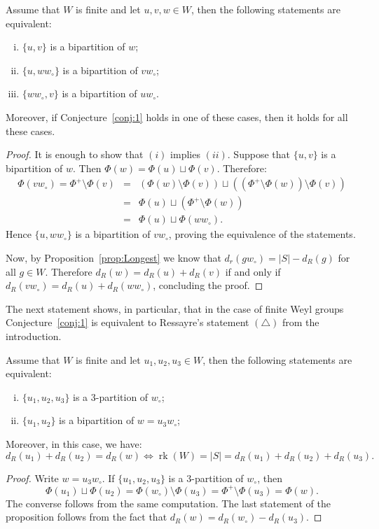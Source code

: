 \documentclass[ALCO,Unicode]{cedram}
\theoremstyle{definition}
\newcommand{\rank}{\operatorname{rk}}
\begin{document}
\begin{prop}\label{prop:ReductionLongest} Assume that $W$ is finite and let $u,v,w\in W$, then the following statements are equivalent:
\begin{enumerate}[(i)]
\item $\{u,v\}$ is a bipartition of $w$;
\item  $\{u,ww_\circ\}$ is a bipartition of $vw_\circ$;
\item $\{ww_\circ,v\}$ is a bipartition of $uw_\circ$.
\end{enumerate}
Moreover, if Conjecture~\ref{conj:1} holds in one of these cases, then it holds for all these cases. 
\end{prop}
\begin{proof} It is enough to show that $(i)$ implies $(ii)$. Suppose that $\{u,v\}$ is a bipartition of $w$. Then $\Phi(w)=\Phi(u)\sqcup \Phi(v)$. Therefore:
\begin{eqnarray*}
\Phi(vw_\circ)=\Phi^+\setminus\Phi(v)&=&(\Phi(w)\setminus \Phi(v)) \sqcup  ((\Phi^+\setminus\Phi(w))\setminus \Phi(v))\\
&=& \Phi(u) \sqcup  (\Phi^+\setminus\Phi(w))\\
&=& \Phi(u) \sqcup  \Phi(ww_\circ).
\end{eqnarray*}
Hence $\{u,ww_\circ\}$ is a bipartition of $vw_\circ$, proving the equivalence of the statements. 

Now, by Proposition~\ref{prop:Longest} we know that $d_r(gw_\circ)= |S|-d_R(g)$ for all $g\in W$. Therefore $d_R(w)=d_R(u)+d_R(v)$ if and only if $d_R(vw_\circ)=d_R(u)+d_R(ww_\circ)$, concluding the proof.
\end{proof}

The next statement shows, in particular, that in the case of finite Weyl groups Conjecture~\ref{conj:1} is equivalent to Ressayre's statement $(\triangle)$ from the introduction.

\begin{prop}\label{prop:Ressayre} Assume that $W$ is finite and let $u_1,u_2,u_3\in W$, then the following statements are equivalent:
\begin{enumerate}[(i)]
\item $\{u_1,u_2,u_3\}$ is a $3$-partition of $w_\circ$;
\item  $\{u_1,u_2\}$ is a bipartition of $w=u_3w_\circ$;
\end{enumerate}
Moreover, in this case, we have:
$$
d_R(u_1)+d_R(u_2)=d_R(w)\iff\rank(W)=|S|=d_R(u_1)+d_R(u_2)+d_R(u_3). 
$$
\end{prop}
\begin{proof} Write $w=u_3w_\circ$. If $\{u_1,u_2,u_3\}$ is a $3$-partition of $w_\circ$, then 
$$
\Phi(u_1)\sqcup\Phi(u_2)=\Phi(w_\circ)\setminus\Phi(u_3)=\Phi^+\setminus\Phi(u_3) = \Phi(w).
$$
The converse follows from the same computation. The last statement of the proposition follows from the fact that $d_R(w)=d_R(w_\circ)-d_R(u_3)$.
\end{proof}
\end{document}
